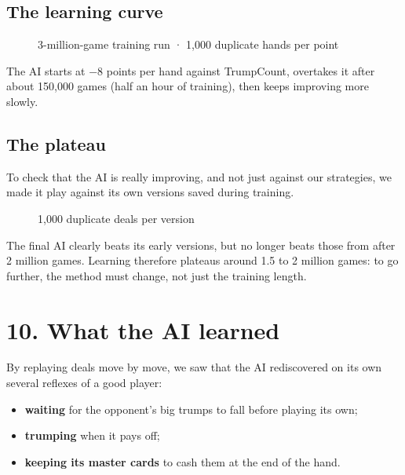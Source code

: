 \subsection*{The learning curve}

\begin{figure}[H]\centering\caption{3-million-game training run · 1,000 duplicate hands per point}\end{figure}

The AI starts at −8 points per hand against TrumpCount, overtakes it after about 150,000 games (half an hour of training), then keeps improving more slowly.

\subsection*{The plateau}

To check that the AI is really improving, and not just against our strategies, we made it play against its own versions saved during training.

\begin{figure}[H]\centering\caption{1,000 duplicate deals per version}\end{figure}

The final AI clearly beats its early versions, but no longer beats those from after 2 million games. Learning therefore plateaus around 1.5 to 2 million games: to go further, the method must change, not just the training length.

\section*{10. What the AI learned}

By replaying deals move by move, we saw that the AI rediscovered on its own several reflexes of a good player:

\begin{itemize}

  \item \textbf{waiting} for the opponent's big trumps to fall before playing its own;

  \item \textbf{trumping} when it pays off;

  \item \textbf{keeping its master cards} to cash them at the end of the hand.

\end{itemize}

